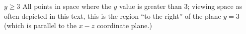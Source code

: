 {$y\geq 3$
}
{All points in space where the $y$ value is greater than 3; viewing space as often depicted in this text, this is the region ``to the right'' of the plane $y=3$ (which is parallel to the $x-z$ coordinate plane.)
}
